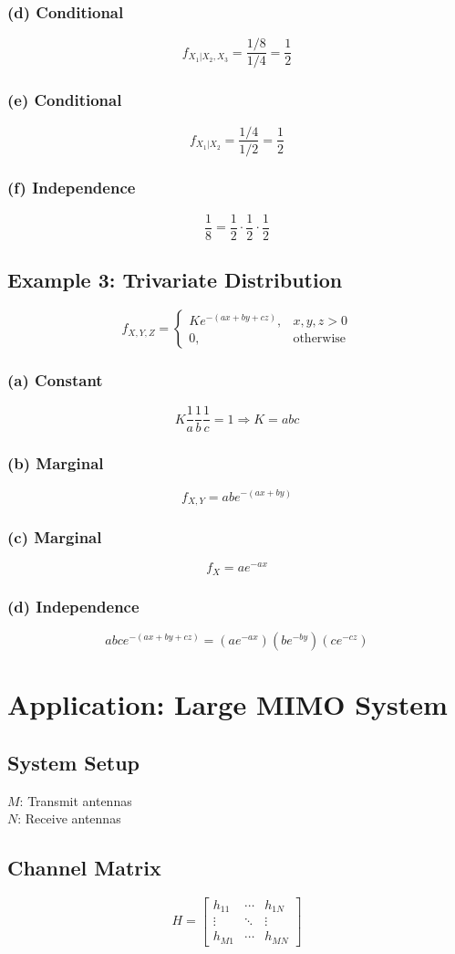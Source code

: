 \documentclass[12pt]{article}
\begin{document}
\subsubsection{(d) Conditional}
\[
f_{X_1|X_2,X_3} = \frac{1/8}{1/4} = \frac{1}{2}
\]

\subsubsection{(e) Conditional}
\[
f_{X_1|X_2} = \frac{1/4}{1/2} = \frac{1}{2}
\]

\subsubsection{(f) Independence}
\[
\frac{1}{8} = \frac{1}{2} \cdot \frac{1}{2} \cdot \frac{1}{2}
\]

\subsection{Example 3: Trivariate Distribution}

\[
f_{X,Y,Z} =
\begin{cases}
K e^{-(ax+by+cz)}, & x,y,z > 0 \\
0, & \text{otherwise}
\end{cases}
\]

\subsubsection{(a) Constant}
\[
K \frac{1}{a}\frac{1}{b}\frac{1}{c} = 1 \Rightarrow K = abc
\]

\subsubsection{(b) Marginal}
\[
f_{X,Y} = abe^{-(ax+by)}
\]

\subsubsection{(c) Marginal}
\[
f_X = ae^{-ax}
\]

\subsubsection{(d) Independence}
\[
abc e^{-(ax+by+cz)} = (ae^{-ax})(be^{-by})(ce^{-cz})
\]

\section{Application: Large MIMO System}

\subsection{System Setup}
$M$: Transmit antennas \\
$N$: Receive antennas

\subsection{Channel Matrix}
\[
H =
\begin{bmatrix}
h_{11} & \cdots & h_{1N} \\
\vdots & \ddots & \vdots \\
h_{M1} & \cdots & h_{MN}
\end{bmatrix}
\]
\end{document}
